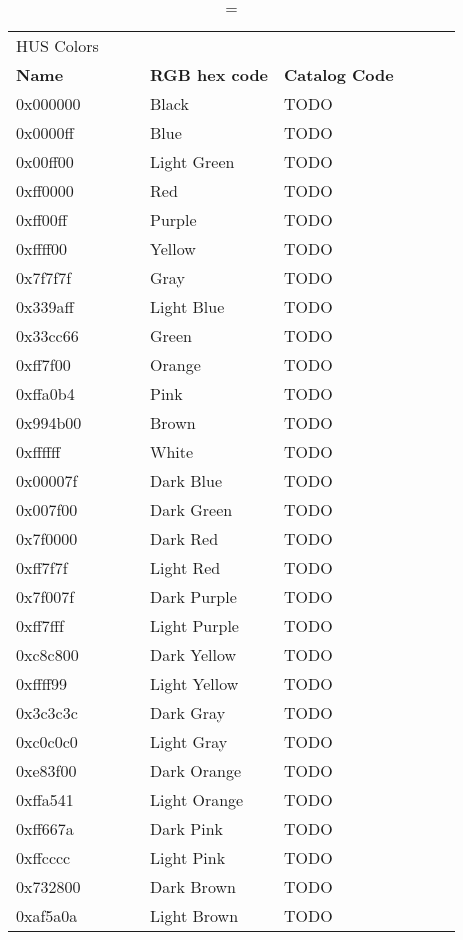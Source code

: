 
\begin{longtable}{p{0.3\linewidth} p{0.3\linewidth} p{0.4\linewidth}}
\caption = {HUS Colors}
\label{tblr:hus}\\
\textbf{Name} & \textbf{RGB hex code} & \textbf{Catalog Code} \\
0x000000 & Black & TODO\\
0x0000ff & Blue & TODO\\
0x00ff00 & Light Green & TODO\\
0xff0000 & Red & TODO\\
0xff00ff & Purple & TODO\\
0xffff00 & Yellow & TODO\\
0x7f7f7f & Gray & TODO\\
0x339aff & Light Blue & TODO\\
0x33cc66 & Green & TODO\\
0xff7f00 & Orange & TODO\\
0xffa0b4 & Pink & TODO\\
0x994b00 & Brown & TODO\\
0xffffff & White & TODO\\
0x00007f & Dark Blue & TODO\\
0x007f00 & Dark Green & TODO\\
0x7f0000 & Dark Red & TODO\\
0xff7f7f & Light Red & TODO\\
0x7f007f & Dark Purple & TODO\\
0xff7fff & Light Purple & TODO\\
0xc8c800 & Dark Yellow & TODO\\
0xffff99 & Light Yellow & TODO\\
0x3c3c3c & Dark Gray & TODO\\
0xc0c0c0 & Light Gray & TODO\\
0xe83f00 & Dark Orange & TODO\\
0xffa541 & Light Orange & TODO\\
0xff667a & Dark Pink & TODO\\
0xffcccc & Light Pink & TODO\\
0x732800 & Dark Brown & TODO\\
0xaf5a0a & Light Brown & TODO\\

\end{longtable}
